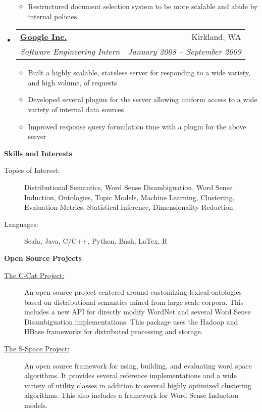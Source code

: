 \documentclass[letterpaper,11pt]{article}
\makeatletter
\newcommand{\resitem}[1]{\item #1 \vspace{-2pt}}
\newcommand{\resheading}[1]{{\large \colorbox{mygrey}{\begin{minipage}{\textwidth}{\textbf{#1 \vphantom{p\^{E}}}}\end{minipage}}}}
\newcommand{\ressubheading}[4]{
\begin{tabular*}{6.5in}{l@{\extracolsep{\fill}}r}
		\textbf{#1} & #2 \\
		\textit{#3} & \textit{#4} \\
\end{tabular*}\vspace{-6pt}}
\makeatother
\begin{document}
\begin{itemize}
{\begin{itemize}
{                       system, improving savings by up to 50\% usage of external
                       resources}
              \resitem{Restructured document selection system to be more
                       scalable and abide by internal policies}
            \end{itemize}
          }
    \item \ressubheading{\href{http://www.Google.com}
                              {Google Inc.}}
                        {Kirkland, WA}
                        {Software Engineering Intern}
                        {January 2008 -- September 2009}
          { \footnotesize
            \begin{itemize}
              \resitem{Built a highly scalable, stateless server for responding
                       to a wide variety, and high volume, of requests}
              \resitem{Developed several plugins for the server
                       allowing uniform access to a wide variety of internal data
                       sources }
              \resitem{Improved response query formulation time with a plugin
                       for the above server}
            \end{itemize}
          }
  \end{itemize}  %

\resheading{Skills and Interests}
  \begin{description}
    \item[Topics of Interest:] { 
      \footnotesize Distributional Semantics, Word Sense Disambiguation, Word
      Sense Induction, Ontologies, Topic Models, Machine Learning, Clustering,
      Evaluation Metrics, Statistical Inference, Dimensionality Reduction 
    }
    \item[Languages:] {
      \footnotesize Scala, Java, C/C++, Python, Bash, LaTex, R
    }
  \end{description} %

\resheading{Open Source Projects}
  \begin{description}
    \item[\href{https://github.com/fozziethebeat/C-Cat} {The C-Cat Project:}] {
      \footnotesize An open source project centered around customizing lexical
      ontologies based on distributional semantics mined from large scale
      corpora.  This includes a new API for directly modify WordNet and several
      Word Sense Disambiguation implementations. This
      package uses the Hadoop and HBase frameworks for distributed processing
      and storage.
    }
    \item[\href{https://github.com/fozziethebeat/S-Space} {The S-Space Project:}] {
      \footnotesize An open source framework for using, building, and evaluating
      word space algorithms.  It provides several reference implementations and
      a wide variety of utility classes in addition to several highly optimized
      clustering algorithms.  This also includes a framework for Word Sense
      Induction models.
    }
  \end{description} %
\end{document}
